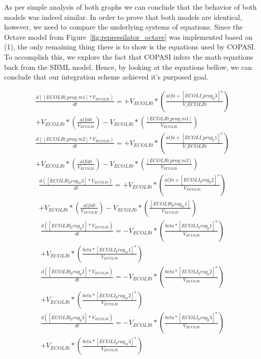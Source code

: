 \documentclass[12pt]{article}
\begin{document}
    As per simple analysis of both graphs we can conclude that the behavior of both models was indeed similar. In order to prove that both models are identical, however, we need to compare the underlying systems of equations. Since the Octave model from Figure~\ref{fig:repressilator_octave} was implemented based on (1), the only remaining thing there is to show is the equations used by COPASI. To accomplish this, we explore the fact that COPASI infers the math equations back from the SBML model. Hence, by looking at the equations bellow, we can conclude that our integration scheme achieved it's purposed goal.
    
    \begin{multline*}
        \frac{d([ECOLI0\_prog\_m1]*V_{ECOLI0})}{dt} = +V_{ECOLI0}*(\frac{alfa + [ECOLI\_prog_p3]^n}{V\_{ECOLI0}}) \\ +V_{ECOLI0}*(\frac{alfa0}{V_{ECOLI0}}) -V_{ECOLI0}*(\frac{[ECOLI0\_prog\_m1]}{V_{ECOLI0}})
    \end{multline*}
    \begin{multline*}
        \frac{d([ECOLI0\_prog\_m2]*V_{ECOLI0})}{dt} = +V_{ECOLI0}*(\frac{alfa + [ECOLI\_prog_p1]^n}{V\_{ECOLI0}}) \\ +V_{ECOLI0}*(\frac{alfa0}{V_{ECOLI0}}) -V_{ECOLI0}*(\frac{[ECOLI0\_prog\_m2]}{V_{ECOLI0}})
    \end{multline*}
    \begin{multline*}
        \frac{d([ECOLI0_prog_m3]*V_{ECOLI0})}{dt} = +V_{ECOLI0}*(\frac{alfa + [ECOLI_prog_p2]^n}{V_{ECOLI0}}) \\ +V_{ECOLI0}*(\frac{alfa0}{V_{ECOLI0}}) -V_{ECOLI0}*(\frac{[ECOLI0_prog_m1]}{V_{ECOLI0}})
    \end{multline*}
    \begin{multline*}
        \frac{d([ECOLI0_prog_p1]*V_{ECOLI0})}{dt} = -V_{ECOLI0}*(\frac{beta*[ECOLI_prog_p1]^n}{V_{ECOLI0}}) \\ +V_{ECOLI0}*(\frac{beta*[ECOLI_prog_m1]^n}{V_{ECOLI0}})
    \end{multline*}
    \begin{multline*}
        \frac{d([ECOLI0_prog_p2]*V_{ECOLI0})}{dt} = -V_{ECOLI0}*(\frac{beta*[ECOLI_prog_p2]^n}{V_{ECOLI0}}) \\ +V_{ECOLI0}*(\frac{beta*[ECOLI_prog_m2]^n}{V_{ECOLI0}})
    \end{multline*}
    \begin{multline*}
        \frac{d([ECOLI0_prog_p3]*V_{ECOLI0})}{dt} = -V_{ECOLI0}*(\frac{beta*[ECOLI_prog_p3]^n}{V_{ECOLI0}}) \\ +V_{ECOLI0}*(\frac{beta*[ECOLI_prog_m3]^n}{V_{ECOLI0}})
    \end{multline*}
    
\end{document}
